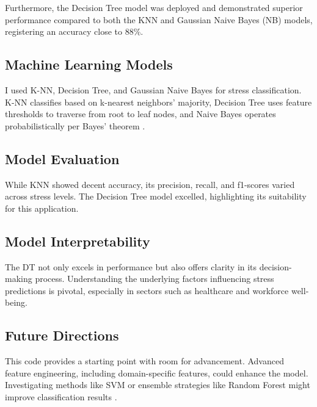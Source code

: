 \documentclass{article}
\begin{document}
Furthermore, the Decision Tree model was deployed and demonstrated superior performance compared to both the KNN and Gaussian Naive Bayes (NB) models, registering an accuracy close to 88\%.




\subsection{Machine Learning Models}
I used K-NN, Decision Tree, and Gaussian Naive Bayes for stress classification. K-NN classifies based on k-nearest neighbors' majority, Decision Tree uses feature thresholds to traverse from root to leaf nodes, and Naive Bayes operates probabilistically per Bayes’ theorem \cite{priya2020}.



\vspace{-0.3cm} %

\subsection{Model Evaluation}
While KNN showed decent accuracy, its precision, recall, and f1-scores varied across stress levels. The Decision Tree model excelled, highlighting its suitability for this application.



\vspace{-0.3cm} %


\subsection{Model Interpretability}
The DT not only excels in performance but also offers clarity in its decision-making process. Understanding the underlying factors influencing stress predictions is pivotal, especially in sectors such as healthcare and workforce well-being.


\vspace{-0.3cm} %
\subsection{Future Directions}
This code provides a starting point with room for advancement. Advanced feature engineering, including domain-specific features, could enhance the model. Investigating methods like SVM or ensemble strategies like Random Forest might improve classification results \cite{priya2020}.
\end{document}
